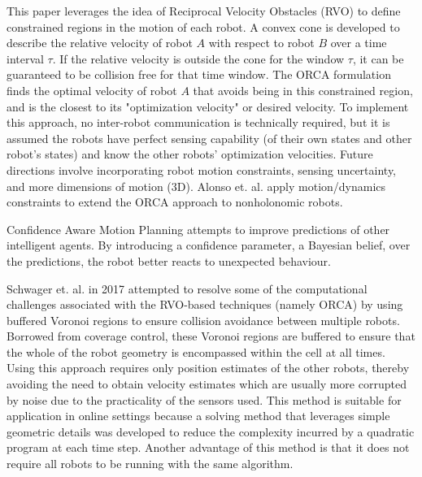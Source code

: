 \documentclass[conference]{IEEEtran}
\begin{document}
This paper leverages the idea of Reciprocal Velocity Obstacles (RVO) to define constrained regions in the motion of each robot. A convex cone is developed to describe the relative velocity of robot $A$ with respect to robot $B$ over a time interval $\tau$. If the relative velocity is outside the cone for the window $\tau$, it can be guaranteed to be collision free for that time window. The ORCA formulation finds the optimal velocity of robot $A$ that avoids being in this constrained region, and is the closest to its "optimization velocity" or desired velocity. To implement this approach, no inter-robot communication is technically required, but it is assumed the robots have perfect sensing capability (of their own states and other robot's states) and know the other robots' optimization velocities. Future directions involve incorporating robot motion constraints, sensing uncertainty, and more dimensions of motion (3D). Alonso et. al. \cite{alonso2013optimal} apply motion/dynamics constraints to extend the ORCA approach to nonholonomic robots.

Confidence Aware Motion Planning \cite{fridovich2020confidence} attempts to improve predictions of other intelligent agents. By introducing a confidence parameter, a Bayesian belief, over the predictions, the robot better reacts to unexpected behaviour.

Schwager et. al. in 2017 \cite{schwager2017} attempted to resolve some of the computational challenges associated with the RVO-based techniques (namely ORCA) by using buffered Voronoi regions to ensure collision avoidance between multiple robots. Borrowed from coverage control, these Voronoi regions are buffered to ensure that the whole of the robot geometry is encompassed within the cell at all times. Using this approach requires only position estimates of the other robots, thereby avoiding the need to obtain velocity estimates which are usually more corrupted by noise due to the practicality of the sensors used. This method is suitable for application in online settings because a solving method that leverages simple geometric details was developed to reduce the complexity incurred by a quadratic program at each time step. Another advantage of this method is that it does not require all robots to be running with the same algorithm.

\end{document}
